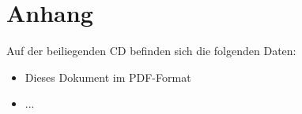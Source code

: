 
\chapter*{Anhang}

Auf der beiliegenden CD befinden sich die folgenden Daten:
\begin{itemize}
	\item Dieses Dokument im PDF-Format
	\item ...
\end{itemize}